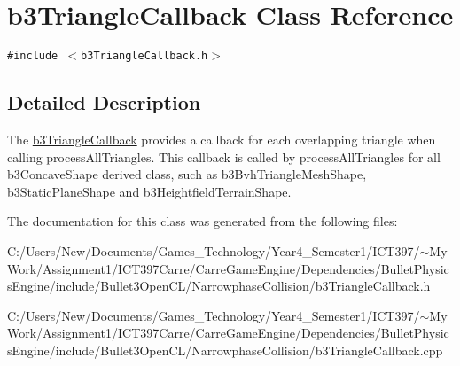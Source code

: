 \hypertarget{classb3_triangle_callback}{
\section{b3TriangleCallback Class Reference}
\label{classb3_triangle_callback}
}
{\tt \#include $<$b3TriangleCallback.h$>$}



\subsection{Detailed Description}
The \hyperlink{classb3_triangle_callback}{b3TriangleCallback} provides a callback for each overlapping triangle when calling processAllTriangles. This callback is called by processAllTriangles for all b3ConcaveShape derived class, such as b3BvhTriangleMeshShape, b3StaticPlaneShape and b3HeightfieldTerrainShape. 

The documentation for this class was generated from the following files:\begin{CompactItemize}
\item 
C:/Users/New/Documents/Games\_\-Technology/Year4\_\-Semester1/ICT397/$\sim$My Work/Assignment1/ICT397Carre/CarreGameEngine/Dependencies/BulletPhysicsEngine/include/Bullet3OpenCL/NarrowphaseCollision/b3TriangleCallback.h\item 
C:/Users/New/Documents/Games\_\-Technology/Year4\_\-Semester1/ICT397/$\sim$My Work/Assignment1/ICT397Carre/CarreGameEngine/Dependencies/BulletPhysicsEngine/include/Bullet3OpenCL/NarrowphaseCollision/b3TriangleCallback.cpp\end{CompactItemize}
